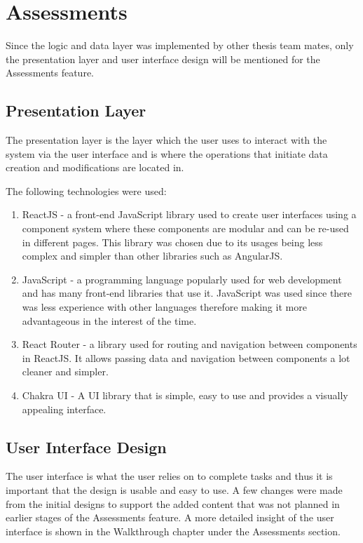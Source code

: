 \section {Assessments}
Since the logic and data layer was implemented by other thesis team mates, only the presentation layer and user interface design will be mentioned for the Assessments feature.

\subsection{Presentation Layer}
The presentation layer is the layer which the user uses to interact with the system via the user interface and is where the operations that initiate data creation and modifications are located in.

The following technologies were used:
\begin{enumerate}
	\item ReactJS - a front-end JavaScript library used to create user interfaces using a component system where these components are modular and can be re-used in different pages. This library was chosen due to its usages being less complex and simpler than other libraries such as AngularJS.
	\item JavaScript - a programming language popularly used for web development and has many front-end libraries that use it. JavaScript was used since there was less experience with other languages therefore making it more advantageous in the interest of the time.
	\item React Router - a library used for routing and navigation between components in ReactJS. It allows passing data and navigation between components a lot cleaner and simpler.
	\item Chakra UI - A UI library that is simple, easy to use and provides a visually appealing interface. 
\end{enumerate}

\subsection{User Interface Design}
The user interface is what the user relies on to complete tasks and thus it is important that the design is usable and easy to use. A few changes were made from the initial designs to support the added content that was not planned in earlier stages of the Assessments feature. A more detailed insight of the user interface is shown in the Walkthrough chapter under the Assessments section. 

